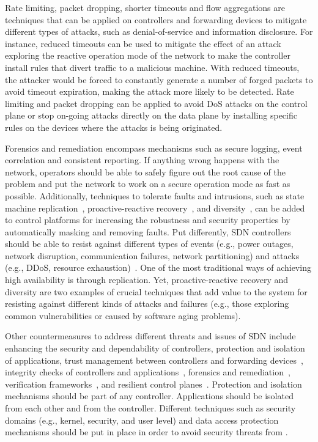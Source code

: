 Rate limiting, packet dropping, shorter timeouts and flow aggregations are techniques that can be applied on controllers and forwarding devices to mitigate different types of attacks, such as denial-of-service and information disclosure.
For instance, reduced timeouts can be used to mitigate the effect of an attack exploring the reactive operation mode of the network to make the controller install rules that divert traffic to a malicious machine. 
With reduced timeouts, the attacker would be forced to constantly generate a number of forged packets to avoid timeout expiration, making the attack more likely to be detected.
Rate limiting and packet dropping can be applied to avoid DoS attacks on the control plane or stop on-going attacks directly on the data plane by installing specific rules on the devices where the attacks is being originated.

Forensics and remediation encompass mechanisms such as secure logging, event correlation and consistent reporting. 
If anything wrong happens with the network, operators should be able to safely figure out the root cause of the problem and put the network to work on a secure operation mode as fast as possible.
Additionally, techniques to tolerate faults and intrusions, such as state machine replication~\cite{bolosky2011}, proactive-reactive recovery~\cite{sousa2010}, and diversity~\cite{garcia2013}, can be added to control platforms for increasing the robustness and security properties by automatically masking and removing faults.
Put differently, SDN controllers should be able to resist against different types of events (e.g., power outages, network disruption, communication failures, network partitioning) and attacks (e.g., DDoS, resource exhaustion)~\cite{kreutz2013,botelho2013}. 
One of the most traditional ways of achieving high availability is through replication. 
Yet, proactive-reactive recovery and diversity are two examples of crucial techniques that add value to the system for resisting against different kinds of attacks and failures (e.g., those exploring common vulnerabilities or caused by software aging problems).

Other countermeasures to address different threats and issues of SDN include enhancing the security and 
dependability of controllers, protection and isolation of applications, trust management between controllers 
and forwarding devices~\cite{kreutz2013}, integrity checks of controllers and applications~\cite{kreutz2013}, forensics and remediation~\cite{sorensen2012,kreutz2013}, 
verification frameworks~\cite{chua2013,porras2012,korniak2011}, and resilient control planes~\cite{fonseca2012,korniak2011,kreutz2013,sorensen2012}.
Protection and isolation mechanisms should be part of any controller. Applications should be isolated from each other and from the controller. 
Different techniques such as security domains (e.g., kernel, security, and user level) and data access protection mechanisms should be put in place in order to avoid security threats from \manapps. 

